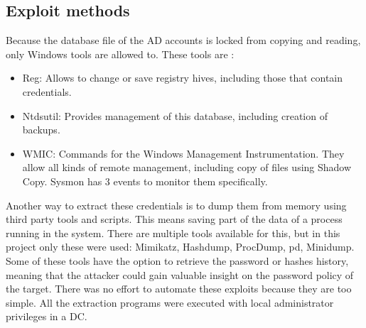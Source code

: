 \subsection{Exploit methods}
Because the database file of the AD accounts is locked from copying and reading, only Windows tools are allowed to. These tools are \cite{dump_ways}:
\begin{itemize}
	\item Reg: Allows to change or save registry hives, including those that contain credentials.
	\item Ntdsutil: Provides management of this database, including creation of backups.
	\item WMIC: Commands for the Windows Management Instrumentation. They allow all kinds of remote management, including copy of files using Shadow Copy. Sysmon has 3 events to monitor them specifically.
\end{itemize}
Another way to extract these credentials is to dump them from memory using third party tools and scripts. This means saving part of the data of a process running in the system\cite{dump_ways}.
There are multiple tools available for this, but in this project only these were used: Mimikatz, Hashdump, ProcDump, pd, Minidump.
\linej
Some of these tools have the option to retrieve the password or hashes history, meaning that the attacker could gain valuable insight on the password policy of the target.
\linej
\linej
There was no effort to automate these exploits because they are too simple.
All the extraction programs were executed with local administrator privileges in a DC.


